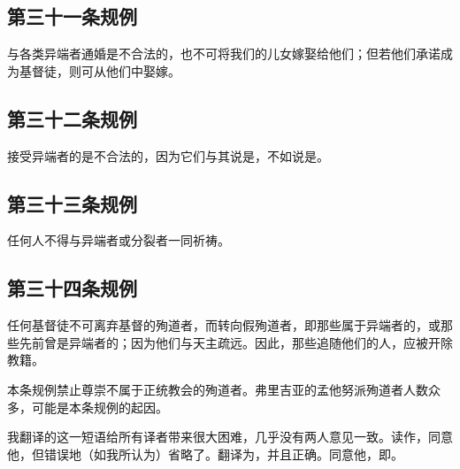 \subsection{第三十一条规例}

与各类异端者通婚是不合法的，也不可将我们的儿女嫁娶给他们；但若他们承诺成为基督徒，则可从他们中娶嫁。\par


\subsection{第三十二条规例}

接受异端者的是不合法的，因为它们与其说是，不如说是。\par


\subsection{第三十三条规例}

任何人不得与异端者或分裂者一同祈祷。\par


\subsection{第三十四条规例}

任何基督徒不可离弃基督的殉道者，而转向假殉道者，即那些属于异端者的，或那些先前曾是异端者的；因为他们与天主疏远。因此，那些追随他们的人，应被开除教籍。\par

\par

本条规例禁止尊崇不属于正统教会的殉道者。弗里吉亚的孟他努派殉道者人数众多，可能是本条规例的起因。\par

我翻译的这一短语给所有译者带来很大困难，几乎没有两人意见一致。读作，同意他，但错误地（如我所认为）省略了。翻译为，并且正确。同意他，即。\par

